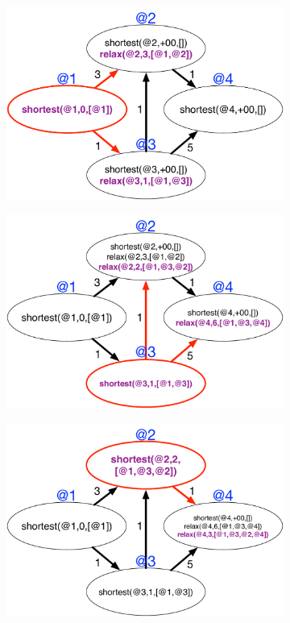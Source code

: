 \begin{figure}
\begin{center}
   \begin{subfigure}[b]{0.49\textwidth}
      \includegraphics[width=\textwidth]{figures/sssp/coord1}
      \mycap{}
   \end{subfigure}
   \begin{subfigure}[b]{0.49\textwidth}
      \includegraphics[width=\textwidth]{figures/sssp/coord2}
      \mycap{}
   \end{subfigure}
   \begin{subfigure}[b]{0.49\textwidth}
      \includegraphics[width=\textwidth]{figures/sssp/coord3}

\end{subfigure}
\end{center}
\end{figure}
